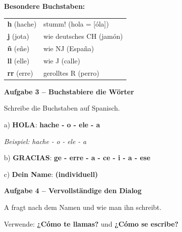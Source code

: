 \documentclass[11pt, a4paper]{article}
\newcommand{\fachfarbe}{spanisch}
\newcommand{\punktebox}[1]{\hfill\fbox{\small \_/#1}}
\newcommand{\lsg}[1]{\textcolor{loesung}{\textbf{#1}}}
\newenvironment{aufgabe}[1]{%
    \needspace{5\baselineskip}%
    \nopagebreak[4]%
    \vspace{10pt}
    \noindent\textbf{\textcolor{\fachfarbe}{Aufgabe #1}}
    \nopagebreak[4]%
    \vspace{5pt}
    \nopagebreak[4]%
    \begin{list}{}{\leftmargin=0pt}
    \item[]
}{%
    \end{list}
}
\newcommand{\es}[1]{\textcolor{\fachfarbe}{\textbf{#1}}}
\begin{document}
\begin{merkkasten}
\textbf{Besondere Buchstaben:}

\vspace{0.3em}

\begin{tabular}{ll}
\es{h} (hache) & stumm! (hola = [óla]) \\
\es{j} (jota) & wie deutsches CH (jamón) \\
\es{ñ} (eñe) & wie NJ (España) \\
\es{ll} (elle) & wie J (calle) \\
\es{rr} (erre) & gerolltes R (perro) \\
\end{tabular}
\end{merkkasten}

\vspace{10pt}


\begin{aufgabe}{3 -- Buchstabiere die Wörter}
Schreibe die Buchstaben auf Spanisch. \punktebox{6}
\end{aufgabe}

\noindent
a) \es{HOLA}: \lsg{hache - o - ele - a}

\vspace{0.5em}
\textit{Beispiel: hache - o - ele - a}

\vspace{1em}

\noindent
b) \es{GRACIAS}: \lsg{ge - erre - a - ce - i - a - ese}

\vspace{1.5em}

\noindent
c) \textbf{Dein Name}: \lsg{(individuell)}

\vspace{15pt}


\begin{aufgabe}{4 -- Vervollständige den Dialog}
A fragt nach dem Namen und wie man ihn schreibt. \punktebox{6}
\end{aufgabe}

\begin{hinweis}
Verwende: \es{¿Cómo te llamas?} und \es{¿Cómo se escribe?}
\end{hinweis}
\end{document}
